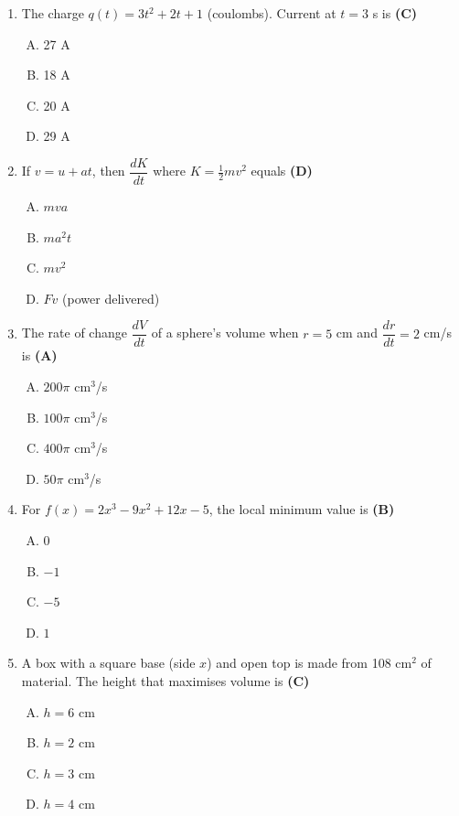 \documentclass[10pt,a4paper]{article}
\begin{document}
\begin{enumerate}[1.]
\item The charge $q(t) = 3t^2 + 2t + 1$ (coulombs). Current at $t = 3$ s is \hfill \textbf{(C)}
\begin{enumerate}[(A)]
    \item 27 A
    \item 18 A
    \item 20 A
    \item 29 A
\end{enumerate}

\item If $v = u + at$, then $\dfrac{dK}{dt}$ where $K = \tfrac{1}{2}mv^2$ equals \hfill \textbf{(D)}
\begin{enumerate}[(A)]
    \item $mva$
    \item $ma^2t$
    \item $mv^2$
    \item $Fv$ (power delivered)
\end{enumerate}

\item The rate of change $\dfrac{dV}{dt}$ of a sphere's volume when $r = 5$ cm and $\dfrac{dr}{dt} = 2$ cm/s is \hfill \textbf{(A)}
\begin{enumerate}[(A)]
    \item $200\pi$ cm$^3$/s
    \item $100\pi$ cm$^3$/s
    \item $400\pi$ cm$^3$/s
    \item $50\pi$ cm$^3$/s
\end{enumerate}

\item For $f(x) = 2x^3 - 9x^2 + 12x - 5$, the local minimum value is \hfill \textbf{(B)}
\begin{enumerate}[(A)]
    \item 0
    \item $-1$
    \item $-5$
    \item $1$
\end{enumerate}

\item A box with a square base (side $x$) and open top is made from 108 cm$^2$ of material. The height that maximises volume is \hfill \textbf{(C)}
\begin{enumerate}[(A)]
    \item $h = 6$ cm
    \item $h = 2$ cm
    \item $h = 3$ cm
    \item $h = 4$ cm
\end{enumerate}


\end{enumerate}
\end{document}
